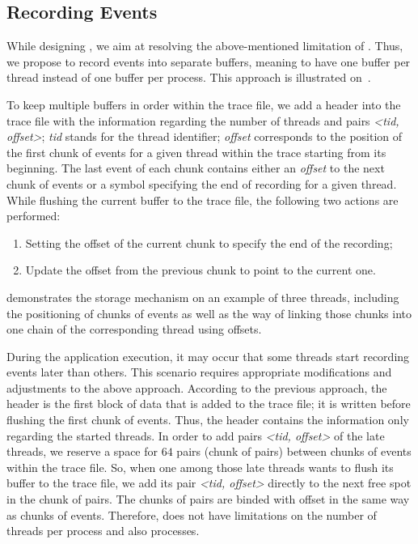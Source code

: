 

\subsection{Recording Events}
While designing \litl{}, we aim at resolving the above-mentioned limitation of 
\fxt{}. Thus, we propose to record events into separate buffers, meaning to 
have one buffer per thread instead of one buffer per process. This approach is
illustrated on~.

To keep multiple buffers in order within the trace file, we add a header into 
the trace file with the information regarding the number of threads and pairs 
\emph{<tid, offset>}; \emph{tid} stands for the thread identifier; 
\emph{offset} corresponds to the position of the first chunk of events for a 
given thread within the trace starting from its beginning. The last event 
of each chunk contains either an \emph{offset} to the next chunk of events 
or a symbol specifying the end of recording for a given thread. While flushing 
the current buffer to the trace file, the following two actions are performed:
\begin{enumerate}
 \item Setting the offset of the current chunk to specify the end of the 
recording;
 \item Update the offset from the previous chunk to point to the current one.
\end{enumerate}
 demonstrates the storage mechanism on an example 
of three threads, including the positioning of chunks of events as well as 
the way of linking those chunks into one chain of the corresponding thread 
using offsets.

During the application execution, it may occur that some threads start 
recording events later than others. This scenario requires appropriate 
modifications and adjustments to the above approach. According to the previous 
approach, the header is the first block of data that is added to the trace file;
it is written before flushing the first chunk of events. Thus, the header 
contains the information only regarding the started threads. In order to add 
pairs \emph{<tid, offset>} of the late threads, we reserve a space for $64$ 
pairs (chunk of pairs) between chunks of events within the trace file. So, when 
one among those late threads wants to flush its buffer to the trace file, we add 
its pair \emph{<tid, offset>} directly to the next free spot in the chunk of  
pairs. The chunks of pairs are binded with offset in the same way as chunks of 
events. Therefore, \eztrace{} does not have limitations on the number of threads 
per process and also processes.

